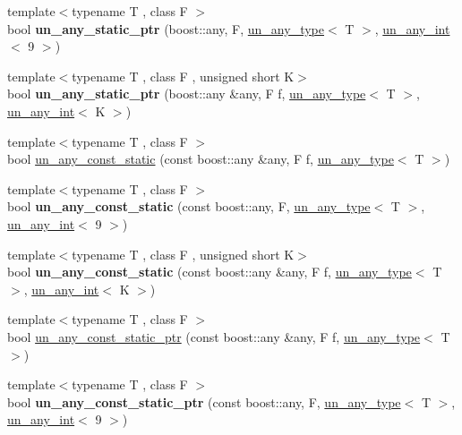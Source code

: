 \begin{DoxyCompactItemize}
{\footnotesize template$<$typename T , class F $>$ }\\bool {\bfseries un\+\_\+any\+\_\+static\+\_\+ptr} (boost\+::any, F, \mbox{\hyperlink{struct_s_m_spp__di__unipi__it_1_1un__any__type}{un\+\_\+any\+\_\+type}}$<$ T $>$, \mbox{\hyperlink{struct_s_m_spp__di__unipi__it_1_1un__any__int}{un\+\_\+any\+\_\+int}}$<$ 9 $>$)
\item 
{\footnotesize template$<$typename T , class F , unsigned short K$>$ }\\bool {\bfseries un\+\_\+any\+\_\+static\+\_\+ptr} (boost\+::any \&any, F f, \mbox{\hyperlink{struct_s_m_spp__di__unipi__it_1_1un__any__type}{un\+\_\+any\+\_\+type}}$<$ T $>$, \mbox{\hyperlink{struct_s_m_spp__di__unipi__it_1_1un__any__int}{un\+\_\+any\+\_\+int}}$<$ K $>$)
\item 
{\footnotesize template$<$typename T , class F $>$ }\\bool \mbox{\hyperlink{group__boost__any__stuff_ga4d88b50d748bc8cbf4647b5db0ea44f0}{un\+\_\+any\+\_\+const\+\_\+static}} (const boost\+::any \&any, F f, \mbox{\hyperlink{struct_s_m_spp__di__unipi__it_1_1un__any__type}{un\+\_\+any\+\_\+type}}$<$ T $>$)
\item 
{\footnotesize template$<$typename T , class F $>$ }\\bool {\bfseries un\+\_\+any\+\_\+const\+\_\+static} (const boost\+::any, F, \mbox{\hyperlink{struct_s_m_spp__di__unipi__it_1_1un__any__type}{un\+\_\+any\+\_\+type}}$<$ T $>$, \mbox{\hyperlink{struct_s_m_spp__di__unipi__it_1_1un__any__int}{un\+\_\+any\+\_\+int}}$<$ 9 $>$)
\item 
{\footnotesize template$<$typename T , class F , unsigned short K$>$ }\\bool {\bfseries un\+\_\+any\+\_\+const\+\_\+static} (const boost\+::any \&any, F f, \mbox{\hyperlink{struct_s_m_spp__di__unipi__it_1_1un__any__type}{un\+\_\+any\+\_\+type}}$<$ T $>$, \mbox{\hyperlink{struct_s_m_spp__di__unipi__it_1_1un__any__int}{un\+\_\+any\+\_\+int}}$<$ K $>$)
\item 
{\footnotesize template$<$typename T , class F $>$ }\\bool \mbox{\hyperlink{group__boost__any__stuff_ga46275e01a585a3a4bfcc243a595aa7dd}{un\+\_\+any\+\_\+const\+\_\+static\+\_\+ptr}} (const boost\+::any \&any, F f, \mbox{\hyperlink{struct_s_m_spp__di__unipi__it_1_1un__any__type}{un\+\_\+any\+\_\+type}}$<$ T $>$)
\item 
{\footnotesize template$<$typename T , class F $>$ }\\bool {\bfseries un\+\_\+any\+\_\+const\+\_\+static\+\_\+ptr} (const boost\+::any, F, \mbox{\hyperlink{struct_s_m_spp__di__unipi__it_1_1un__any__type}{un\+\_\+any\+\_\+type}}$<$ T $>$, \mbox{\hyperlink{struct_s_m_spp__di__unipi__it_1_1un__any__int}{un\+\_\+any\+\_\+int}}$<$ 9 $>$)

\end{DoxyCompactItemize}
